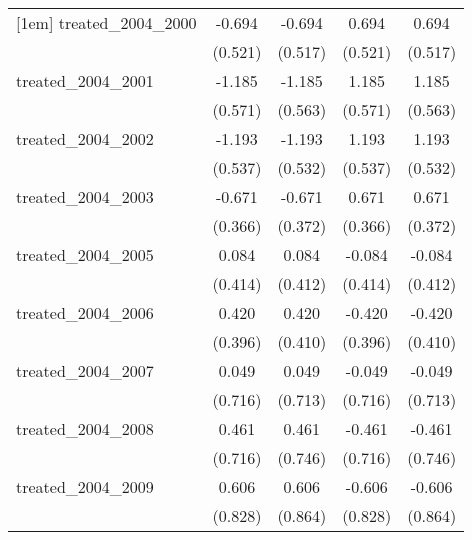 {\begin{tabular}{l*{4}{c}}
[1em]
treated\_2004\_2000&      -0.694         &      -0.694         &       0.694         &       0.694         \\
            &     (0.521)         &     (0.517)         &     (0.521)         &     (0.517)         \\
[1em]
treated\_2004\_2001&      -1.185\sym{*}  &      -1.185\sym{*}  &       1.185\sym{*}  &       1.185\sym{*}  \\
            &     (0.571)         &     (0.563)         &     (0.571)         &     (0.563)         \\
[1em]
treated\_2004\_2002&      -1.193\sym{*}  &      -1.193\sym{*}  &       1.193\sym{*}  &       1.193\sym{*}  \\
            &     (0.537)         &     (0.532)         &     (0.537)         &     (0.532)         \\
[1em]
treated\_2004\_2003&      -0.671         &      -0.671         &       0.671         &       0.671         \\
            &     (0.366)         &     (0.372)         &     (0.366)         &     (0.372)         \\
[1em]
treated\_2004\_2005&       0.084         &       0.084         &      -0.084         &      -0.084         \\
            &     (0.414)         &     (0.412)         &     (0.414)         &     (0.412)         \\
[1em]
treated\_2004\_2006&       0.420         &       0.420         &      -0.420         &      -0.420         \\
            &     (0.396)         &     (0.410)         &     (0.396)         &     (0.410)         \\
[1em]
treated\_2004\_2007&       0.049         &       0.049         &      -0.049         &      -0.049         \\
            &     (0.716)         &     (0.713)         &     (0.716)         &     (0.713)         \\
[1em]
treated\_2004\_2008&       0.461         &       0.461         &      -0.461         &      -0.461         \\
            &     (0.716)         &     (0.746)         &     (0.716)         &     (0.746)         \\
[1em]
treated\_2004\_2009&       0.606         &       0.606         &      -0.606         &      -0.606         \\
            &     (0.828)         &     (0.864)         &     (0.828)         &     (0.864)         \\

\end{tabular}}
